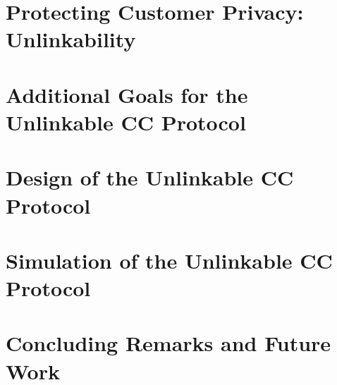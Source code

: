 \documentclass[12pt]{report}
\begin{document}
\chapter{Protecting Customer Privacy: Unlinkability}
\label{cha:unlinkability}




\chapter{Additional Goals for the Unlinkable CC Protocol}
\label{cha:unlinkable_goals}






\chapter{Design of the Unlinkable CC Protocol}
\label{cha:unlinkable_design}






\chapter{Simulation of the Unlinkable CC Protocol}
\label{cha:simulation}

\chapter{Concluding Remarks and Future Work}
\label{cha:conclusion}




\printindex

\begin{vita}

\end{vita}
\end{document}
